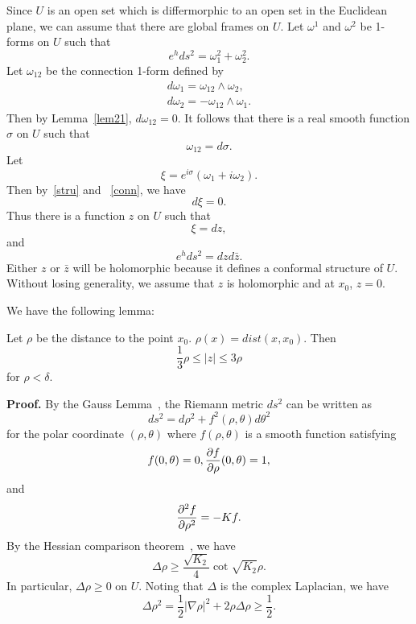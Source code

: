 Since $U$ is an open set which is differmorphic to an open set in the
Euclidean plane, we can assume that there are global frames on $U$.
Let $\omega^1$ and $\omega^2$ be 1-forms on $U$ such that 
\[
e^hds^2=\omega_1^2+\omega_2^2.
\]
Let $\omega_{12}$ be the connection 1-form defined by
\begin{equation}\label{stru}
\begin{array}{l}
d\omega_1=\omega_{12}\wedge\omega_2,\\
d\omega_2=-\omega_{12}
\wedge\omega_1.
\end{array}
\end{equation}
Then by Lemma~\ref{lem21}, $d\omega_{12}=0$.
It follows that there is a  real smooth function $\sigma$ on $U$ such that
\begin{equation}\label{conn}
\omega_{12}=d\sigma.
\end{equation}
Let 
\[
\xi=e^{i\sigma}(\omega_1+i\omega_2).
\]
Then by~\eqref{stru} and ~\eqref{conn}, we have
\[
d\xi=0.
\]
Thus  there is a function $z$ on $U$ such that
\[
\xi=dz,
\]
and 
\begin{equation}\label{flat}
e^hds^2=dzd\bar z.
\end{equation}
Either $z$ or $\bar
z$ will be holomorphic because it defines a conformal structure of $U$.
Without losing generality, we assume that $z$ is holomorphic
and at $x_0$, $z=0$.

We have the following lemma:

\begin{lemma}\label{esti}
 Let $\rho$ be the distance to the point
$x_0$. $\rho(x)=dist(x,x_0)$. Then
\begin{equation}\label{27}
\frac 13\rho\leq |z|\leq 3\rho 
\end{equation}
for $\rho<\delta$.
\end{lemma}

{\bf Proof.} By the Gauss Lemma~\cite[page 8]{CE}, the Riemann metric
$ds^2$ can be
written as
\[
ds^2=d\rho^2+f^2(\rho,\theta)d\theta^2
\]
for the polar coordinate $(\rho,\theta)$
where $f(\rho,\theta)$ is a smooth function satisfying
\[
f(0,\theta)=0, \frac{\partial f}{\partial\rho}(0,\theta)=1,
\]
and 
\[
\frac{\partial^2 f}{\partial\rho^2}=-Kf.
\]
By the Hessian comparison theorem~\cite[page 4]{SY}, we have
\[
\Delta\rho\geq\frac{\sqrt{K_2}}{4}\cot\sqrt{K_2}\rho.
\]
In particular, $\Delta\rho\geq 0$ on $U$.
Noting that $\Delta$ is the complex Laplacian, we have 
\begin{equation}\label{dist}
\Delta\rho^2=\frac 12|\nabla\rho |^2+2\rho\Delta\rho\geq \frac 12.
\end{equation}


